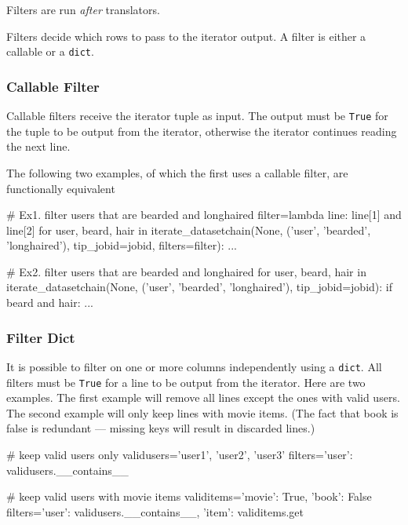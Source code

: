 Filters are run \emph{after} translators.

Filters decide which rows to pass to the iterator output.  A filter is
either a callable or a \texttt{dict}.


\subsubsection*{Callable Filter}

Callable filters receive the iterator tuple as input.  The output must
be \texttt{True} for the tuple to be output from the iterator,
otherwise the iterator continues reading the next line.

The following two examples, of which the first uses a callable filter,
are functionally equivalent

\begin{python}
# Ex1.  filter users that are bearded and longhaired
filter=lambda line: line[1] and line[2]
for user, beard, hair in iterate_datasetchain(None, ('user', 'bearded', 'longhaired'),
                                       tip_jobid=jobid, filters=filter):
    ...

# Ex2.  filter users that are bearded and longhaired
for user, beard, hair in iterate_datasetchain(None, ('user', 'bearded', 'longhaired'),
                                       tip_jobid=jobid):
    if beard and hair:
        ...
\end{python}




\subsubsection*{Filter Dict}

It is possible to filter on one or more columns independently using a
\texttt{dict}.  All filters must be \texttt{True} for a line to be
output from the iterator.  Here are two examples.  The first example
will remove all lines except the ones with valid users.  The second
example will only keep lines with movie items.  (The fact that book is
false is redundant --- missing keys will result in discarded lines.)

\begin{python}
# keep valid users only
validusers={'user1', 'user2', 'user3'}
filters={'user': validusers.__contains__}

# keep valid users with movie items
validitems={'movie': True, 'book': False}
filters={'user': validusers.__contains__, 'item': validitems.get}
\end{python}




